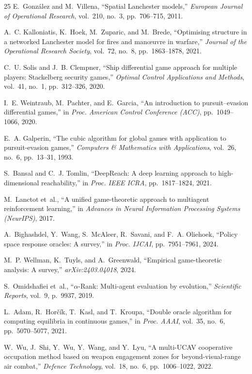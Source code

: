 \documentclass[12pt,a4paper]{article}
\begin{document}
\begin{thebibliography}{25}
E.~Gonz{\'a}lez and M.~Villena, ``Spatial Lanchester models,'' \emph{European
Journal of Operational Research}, vol.~210, no.~3, pp.~706--715, 2011.

A.~C. Kalloniatis, K.~Hoek, M.~Zuparic, and M.~Brede, ``Optimising
structure in a networked Lanchester model for fires and man{\oe}uvre in
warfare,'' \emph{Journal of the Operational Research Society}, vol.~72,
no.~8, pp.~1863--1878, 2021.

C.~U. Solis and J.~B. Clempner, ``Ship differential game approach for
multiple players: Stackelberg security games,'' \emph{Optimal Control
Applications and Methods}, vol.~41, no.~1, pp.~312--326, 2020.

I.~E. Weintraub, M.~Pachter, and E.~Garcia, ``An introduction to
pursuit--evasion differential games,'' in \emph{Proc. American Control
Conference (ACC)}, pp.~1049--1066, 2020.

E.~A. Galperin, ``The cubic algorithm for global games with application to
pursuit-evasion games,'' \emph{Computers \& Mathematics with Applications},
vol.~26, no.~6, pp.~13--31, 1993.

S.~Bansal and C.~J. Tomlin, ``DeepReach: A deep learning approach to
high-dimensional reachability,'' in \emph{Proc. IEEE ICRA}, pp.~1817--1824,
2021.

M.~Lanctot et~al., ``A unified game-theoretic approach to multiagent
reinforcement learning,'' in \emph{Advances in Neural Information
Processing Systems (NeurIPS)}, 2017.

A.~Bighashdel, Y.~Wang, S.~McAleer, R.~Savani, and F.~A. Oliehoek,
``Policy space response oracles: A survey,'' in \emph{Proc. IJCAI},
pp.~7951--7961, 2024.

M.~P. Wellman, K.~Tuyls, and A.~Greenwald, ``Empirical game-theoretic
analysis: A survey,'' \emph{arXiv:2403.04018}, 2024.

S.~Omidshafiei et~al., ``$\alpha$-Rank: Multi-agent evaluation by
evolution,'' \emph{Scientific Reports}, vol.~9, p.~9937, 2019.

L.~Adam, R.~Hor{\v{c}}{\'i}k, T.~Kasl, and T.~Kroupa, ``Double oracle
algorithm for computing equilibria in continuous games,'' in \emph{Proc.
AAAI}, vol.~35, no.~6, pp.~5070--5077, 2021.

W.~Wu, J.~Shi, Y.~Wu, Y.~Wang, and Y.~Lyu, ``A multi-UCAV cooperative
occupation method based on weapon engagement zones for beyond-visual-range
air combat,'' \emph{Defence Technology}, vol.~18, no.~6, pp.~1006--1022,
2022.

\end{thebibliography}
\end{document}
